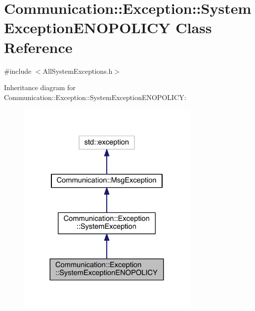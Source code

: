 \hypertarget{class_communication_1_1_exception_1_1_system_exception_e_n_o_p_o_l_i_c_y}{}\section{Communication\+:\+:Exception\+:\+:System\+Exception\+E\+N\+O\+P\+O\+L\+I\+C\+Y Class Reference}
\label{class_communication_1_1_exception_1_1_system_exception_e_n_o_p_o_l_i_c_y}


{\ttfamily \#include $<$All\+System\+Exceptions.\+h$>$}



Inheritance diagram for Communication\+:\+:Exception\+:\+:System\+Exception\+E\+N\+O\+P\+O\+L\+I\+C\+Y\+:\nopagebreak
\begin{figure}[H]
\begin{center}
\leavevmode
\includegraphics[width=252pt]{class_communication_1_1_exception_1_1_system_exception_e_n_o_p_o_l_i_c_y__inherit__graph}
\end{center}
\end{figure}


